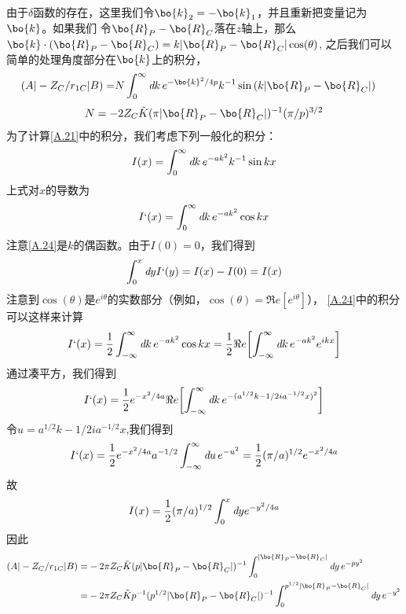 由于$\delta$函数的存在，这里我们令$\bo{k}_2=-\bo{k}_1$，并且重新把变量记为$\bo{k}$。如果我们
令$\bo{R}_P-\bo{R}_C$落在$z$轴上，那么$\bo{k}\cdot(\bo{R}_P-\bo{R}_C)=k|\bo{R}_P-\bo{R}_C|\cos(\theta)$,
之后我们可以简单的处理角度部分在$\bo{k}$上的积分，
\begin{align}
	\label{A.21}
	(A|-Z_C/r_{1C}|B)=&N\int^{\infty}_0\emph{d}k\,e^{-\bo{k}^2/4p}k^{-1}\sin{(k|\bo{R}_P-\bo{R}_C|)}
\end{align}
\begin{align}
	\label{A.22}
	N=-2Z_C\tilde{K}(\pi |\bo{R}_P-\bo{R}_C|)^{-1}(\pi/p)^{3/2}
\end{align}
为了计算\autoref{A.21}中的积分，我们考虑下列一般化的积分：
\begin{align}
	\label{A.23}
	I(x)=\int^{\infty}_0\emph{d}k\,e^{-a k^2}k^{-1}\sin{kx}
\end{align}
上式对$x$的导数为
\begin{align}
	\label{A.24}
	I`(x)=\int^{\infty}_0\emph{d}k\,e^{-a k^2}\cos{kx}
\end{align}
注意\autoref{A.24}是$k$的偶函数。由于$I(0)=0$，我们得到
\begin{align}
	\label{A.25}
	\int^{x}_0 \emph{d}yI`(y)=I(x)-I(0)=I(x)
\end{align}
注意到$\cos(\theta)$是$e^{i\theta}$的实数部分（例如，$\cos(\theta)=\Re e[e^{i\theta}]$），
\autoref{A.24}中的积分可以这样来计算
\begin{align}
	\label{A.26}
	I`(x)=\frac{1}{2}\int^{\infty}_{-\infty}\emph{d}k\,e^{-a k^2}\cos{kx}=\frac{1}{2}\Re e\biggl[\int^{\infty}_{-\infty}\emph{d}k\,e^{-a k^2}e^{ikx}\biggr]
\end{align}
通过凑平方，我们得到
\begin{align}
	\label{A.27}
	I`(x)=\frac{1}{2}e^{-x^2/4a}\Re e\biggl[\int^{\infty}_{-\infty}\emph{d}k\,e^{-(a^{1/2}k-1/2i a^{-1/2}x)^2}\biggr]
\end{align}
令$u=a^{1/2}k-1/2i a^{-1/2}x$,我们得到
\begin{align}
	\label{A.28}
	I`(x)=\frac{1}{2}e^{-x^2/4a}a^{-1/2}\int^{\infty}_{-\infty}\emph{d}u\,e^{-u^2}=\frac{1}{2}(\pi /a)^{1/2}e^{-x^2/4a}
\end{align}
故
\begin{align}
	\label{A.29}
	I(x)=\frac{1}{2}(\pi /a)^{1/2}\int^{x}_{0}\emph{d}ye^{-y^2/4a}
\end{align}
因此
\begin{align}
	\label{A.30}
	(A|-Z_C/r_{1C}|B)=&-2\pi Z_C\tilde{K}(p|\bo{R}_P-\bo{R}_C|)^{-1}\int^{|\bo{R}_P-\bo{R}_C|}_{0}\emph{d}y\,e^{-py^2}
\nonumber\\
	=&-2\pi Z_C\tilde{K}p^{-1}(p^{1/2}|\bo{R}_P-\bo{R}_C|)^{-1}\int^{p^{1/2}|\bo{R}_P-\bo{R}_C|}_{0}\emph{d}y\,e^{-y^2}
\end{align}
